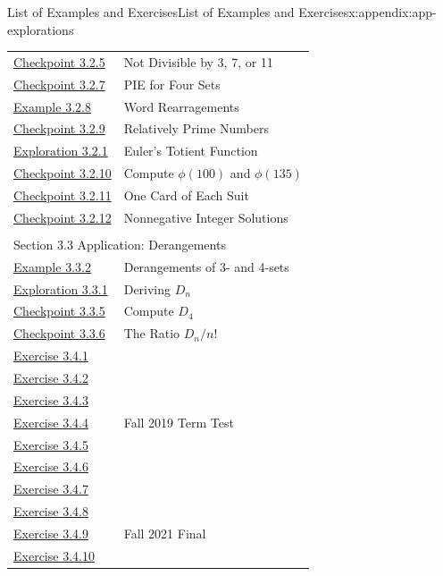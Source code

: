 \documentclass[oneside,10pt,]{book}
\numberwithin{equation}{section}
\begin{document}
\begin{appendixptx}{List of Examples and Exercises}{}{List of Examples and Exercises}{}{}{x:appendix:app-explorations}
\begin{longtable}[l]{ll}
\hyperref[x:exercise:ex-pie-divisible-3-7-11]{Checkpoint 3.2.5}& Not Divisible by 3, 7, or 11\\
\hyperref[x:exercise:ex-pie-4sets]{Checkpoint 3.2.7}& PIE for Four Sets\\
\hyperref[x:example:eg-pie-EQUATION]{Example 3.2.8}& Word Rearragements\\
\hyperref[x:exercise:ex-pie-relatively-prime]{Checkpoint 3.2.9}& Relatively Prime Numbers\\
\hyperref[x:exploration:expl-pie-euler-totient]{Exploration 3.2.1}& Euler's Totient Function\\
\hyperref[x:exercise:ex-pie-apply-totient]{Checkpoint 3.2.10}& Compute \(\phi(100)\) and \(\phi(135)\)\\
\hyperref[x:exercise:ex-pie-cards]{Checkpoint 3.2.11}& One Card of Each Suit\\
\hyperref[x:exercise:ex-pie-nonnegative]{Checkpoint 3.2.12}& Nonnegative Integer Solutions\\
\multicolumn{2}{l}{\null}\\[1.5ex] \multicolumn{2}{l}{\large Section 3.3 Application: Derangements}\\[0.5ex]
\hyperref[x:example:eg-derangement-34]{Example 3.3.2}& Derangements of 3- and 4-sets\\
\hyperref[x:exploration:expl-derangement-Dn]{Exploration 3.3.1}& Deriving \(D_n\)\\
\hyperref[x:exercise:ex-derangement-D4]{Checkpoint 3.3.5}& Compute \(D_4\)\\
\hyperref[x:exercise:ex-derangement-ratio]{Checkpoint 3.3.6}& The Ratio \(D_n/n!\)\\
\hyperlink{g:exercise:id534728}{Exercise 3.4.1}& \\
\hyperlink{g:exercise:id534772}{Exercise 3.4.2}& \\
\hyperlink{g:exercise:id534808}{Exercise 3.4.3}& \\
\hyperlink{g:exercise:id534826}{Exercise 3.4.4}& Fall 2019 Term Test\\
\hyperlink{g:exercise:id534872}{Exercise 3.4.5}& \\
\hyperlink{g:exercise:id534856}{Exercise 3.4.6}& \\
\hyperlink{g:exercise:id534878}{Exercise 3.4.7}& \\
\hyperlink{g:exercise:id534948}{Exercise 3.4.8}& \\
\hyperlink{g:exercise:id534930}{Exercise 3.4.9}& Fall 2021 Final\\
\hyperlink{g:exercise:id534934}{Exercise 3.4.10}& \\

\end{longtable}
\end{appendixptx}
\end{document}
